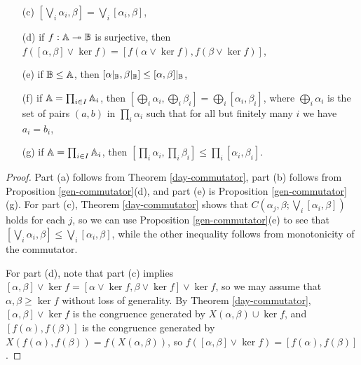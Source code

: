 \begin{appendices}
\begin{prop}
\begin{itemize}
\item[(c)] $[\bigvee_i \alpha_i, \beta] = \bigvee_i[\alpha_i,\beta]$,

\item[(d)] if $f : \mathbb{A} \twoheadrightarrow \mathbb{B}$ is surjective, then $f([\alpha,\beta]\vee \ker f) = [f(\alpha \vee \ker f), f(\beta \vee \ker f)]$,

\item[(e)] if $\mathbb{B} \le \mathbb{A}$, then $[\alpha|_{\mathbb{B}},\beta|_{\mathbb{B}}] \le [\alpha,\beta]|_{\mathbb{B}}$,

\item[(f)] if $\mathbb{A} = \prod_{i \in I} \mathbb{A}_i$, then $[\bigoplus_i \alpha_i, \bigoplus_i \beta_i] = \bigoplus_i[\alpha_i,\beta_i]$, where $\bigoplus_i \alpha_i$ is the set of pairs $(a,b)$ in $\prod_i \alpha_i$ such that for all but finitely many $i$ we have $a_i = b_i$,

\item[(g)] if $\mathbb{A} = \prod_{i \in I} \mathbb{A}_i$, then $[\prod_i \alpha_i, \prod_i \beta_i] \le \prod_i [\alpha_i, \beta_i]$.
\end{itemize}
\end{prop}
\begin{proof} Part (a) follows from Theorem \ref{day-commutator}, part (b) follows from Proposition \ref{gen-commutator}(d), and part (e) is Proposition \ref{gen-commutator}(g). For part (c), Theorem \ref{day-commutator} shows that $C(\alpha_j,\beta;\bigvee_i [\alpha_i,\beta])$ holds for each $j$, so we can use Proposition \ref{gen-commutator}(e) to see that $[\bigvee_i \alpha_i, \beta] \le \bigvee_i[\alpha_i,\beta]$, while the other inequality follows from monotonicity of the commutator.

For part (d), note that part (c) implies $[\alpha,\beta]\vee \ker f = [\alpha \vee \ker f, \beta \vee \ker f] \vee \ker f$, so we may assume that $\alpha,\beta \ge \ker f$ without loss of generality. By Theorem \ref{day-commutator}, $[\alpha,\beta]\vee \ker f$ is the congruence generated by $X(\alpha,\beta) \cup \ker f$, and $[f(\alpha),f(\beta)]$ is the congruence generated by $X(f(\alpha),f(\beta)) = f(X(\alpha,\beta))$, so $f([\alpha,\beta]\vee \ker f) = [f(\alpha),f(\beta)]$.



\end{proof}
\end{appendices}
